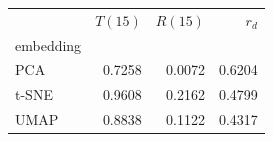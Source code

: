 \begin{tabular}{lrrr}
\toprule
 & $T(15)$ & $R(15)$ & $r_d$ \\
embedding &  &  &  \\
\midrule
PCA & 0.7258 & 0.0072 & 0.6204 \\
t-SNE & 0.9608 & 0.2162 & 0.4799 \\
UMAP & 0.8838 & 0.1122 & 0.4317 \\
\bottomrule
\end{tabular}
